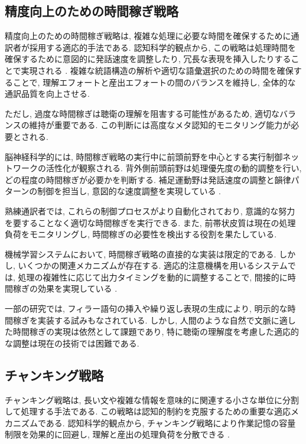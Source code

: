 \subsection{精度向上のための時間稼ぎ戦略}

精度向上のための時間稼ぎ戦略は, 複雑な処理に必要な時間を確保するために通訳者が採用する適応的手法である.
認知科学的観点から, この戦略は処理時間を確保するために意図的に発話速度を調整したり, 冗長な表現を挿入したりすることで実現される \cite{gile1995basic}.
複雑な統語構造の解析や適切な語彙選択のための時間を確保することで, 理解エフォートと産出エフォートの間のバランスを維持し, 全体的な通訳品質を向上させる.

ただし, 過度な時間稼ぎは聴衛の理解を阻害する可能性があるため, 適切なバランスの維持が重要である.
この判断には高度なメタ認知的モニタリング能力が必要とされる.

脳神経科学的には, 時間稼ぎ戦略の実行中に前頭前野を中心とする実行制御ネットワークの活性化が観察される.
背外側前頭前野は処理優先度の動的調整を行い, どの程度の時間稼ぎが必要かを判断する.
補足運動野は発話速度の調整と韻律パターンの制御を担当し, 意図的な速度調整を実現している \cite{rinne2000left}.

熟練通訳者では, これらの制御プロセスがより自動化されており, 意識的な努力を要することなく適切な時間稼ぎを実行できる.
また, 前帯状皮質は現在の処理負荷をモニタリングし, 時間稼ぎの必要性を検出する役割を果たしている.

機械学習システムにおいて, 時間稼ぎ戦略の直接的な実装は限定的である.
しかし, いくつかの関連メカニズムが存在する.
適応的注意機構を用いるシステムでは, 処理の複雑性に応じて出力タイミングを動的に調整することで, 間接的に時間稼ぎの効果を実現している \cite{ma2023efficient}.

一部の研究では, フィラー語句の挿入や繰り返し表現の生成により, 明示的な時間稼ぎを実装する試みもなされている.
しかし, 人間のような自然で文脈に適した時間稼ぎの実現は依然として課題であり, 特に聴衛の理解度を考慮した適応的な調整は現在の技術では困難である.

\subsection{チャンキング戦略}

チャンキング戦略は, 長い文や複雑な情報を意味的に関連する小さな単位に分割して処理する手法である.
この戦略は認知的制約を克服するための重要な適応メカニズムである.
認知科学的観点から, チャンキング戦略により作業記憶の容量制限を効果的に回避し, 理解と産出の処理負荷を分散できる \cite{daro1994memory}.

